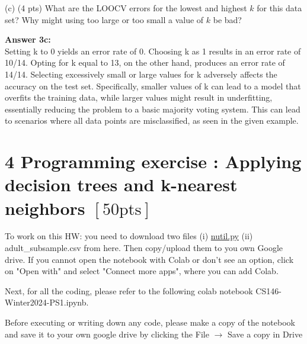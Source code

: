 \documentclass[10pt]{article}
\begin{document}
(c) (4 pts) What are the LOOCV errors for the lowest and highest $k$ for this data set? Why might using too large or too small a value of $k$ be bad?

\begin{flushleft}

\textbf{Answer 3c:} \\

Setting k to 0 yields an error rate of 0. Choosing k as 1 results in an error rate of 10/14. Opting for k equal to 13, on the other hand, produces an error rate of 14/14. Selecting excessively small or large values for k adversely affects the accuracy on the test set. Specifically, smaller values of k can lead to a model that overfits the training data, while larger values might result in underfitting, essentially reducing the problem to a basic majority voting system. This can lead to scenarios where all data points are misclassified, as seen in the given example.
    
\end{flushleft}

\hspace{1 cm}

\section*{4 Programming exercise : Applying decision trees and k-nearest neighbors $[50 \mathrm{pts}]$}
To work on this HW: you need to download two files (i) \href{http://nutil.py}{nutil.py} (ii) adult\_subsample.csv from here. Then copy/upload them to you own Google drive. If you cannot open the notebook with Colab or don't see an option, click on "Open with" and select "Connect more apps", where you can add Colab.

Next, for all the coding, please refer to the following colab notebook CS146-Winter2024-PS1.ipynb.

Before executing or writing down any code, please make a copy of the notebook and save it to your own google drive by clicking the File $\rightarrow$ Save a copy in Drive
\end{document}
